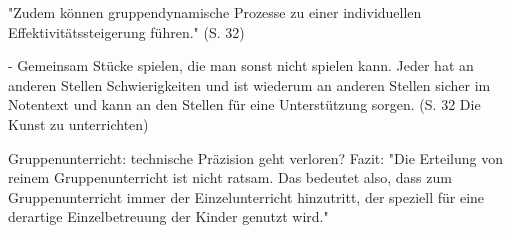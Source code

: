 "Zudem können gruppendynamische Prozesse zu einer individuellen
Effektivitätssteigerung führen." (S. 32)

- Gemeinsam Stücke spielen, die man sonst nicht spielen kann. Jeder hat an
anderen Stellen Schwierigkeiten und ist wiederum an anderen Stellen sicher im
Notentext und kann an den Stellen für eine Unterstützung sorgen. (S. 32 Die
Kunst zu unterrichten)

Gruppenunterricht: technische Präzision geht verloren? 
Fazit: "Die  Erteilung von reinem Gruppenunterricht ist nicht ratsam. Das
bedeutet also, dass zum Gruppenunterricht immer der Einzelunterricht hinzutritt,
der speziell für eine derartige Einzelbetreuung der Kinder genutzt wird."
\autocite[57]{ernst:die_zukunftsfaehige_musikschule}








